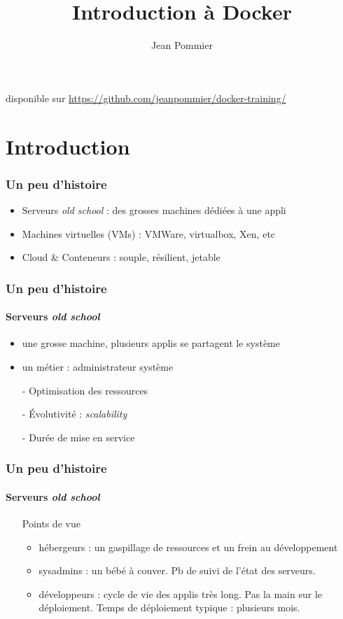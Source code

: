 \documentclass[11pt]{beamer}
\begin{document}
	\author{Jean Pommier}
	\title{Introduction à Docker}
	\begin{frame}[plain]
	\maketitle
	\scriptsize disponible sur \url{https://github.com/jeanpommier/docker-training/}
\end{frame}

\section{Introduction}

\begin{frame}
\frametitle{Un peu d'histoire}
\begin{itemize}
\item Serveurs \textit{old school} : des grosses machines dédiées à une appli
\item Machines virtuelles (VMs) : VMWare, virtualbox, Xen, etc
\item Cloud \& Conteneurs : souple, résilient, jetable
\end{itemize}
\end{frame}

\begin{frame}
\frametitle{Un peu d'histoire}
\framesubtitle{Serveurs \em old school}
\begin{itemize}
	\item une grosse machine, plusieurs applis se partagent le système
	\item un métier : administrateur système
	\vspace{0.5em}
	\item[-] Optimisation des ressources
	\item[-] Évolutivité : \textit{scalability}
	\item[-] Durée de mise en service
\end{itemize}
\end{frame}

\begin{frame}
\frametitle{Un peu d'histoire}
\framesubtitle{Serveurs \em old school}
\begin{itemize}
	\item[] Points de vue
	\begin{itemize}
		\item hébergeurs : un gaspillage de ressources et un frein au développement
		\item sysadmins : un bébé à couver. Pb de suivi de l'état des serveurs. 
		\item développeurs : cycle de vie des applis très long. Pas la main sur le déploiement. Temps de déploiement typique : plusieurs mois.
	\end{itemize}
\end{itemize}
\end{frame}
\end{document}
